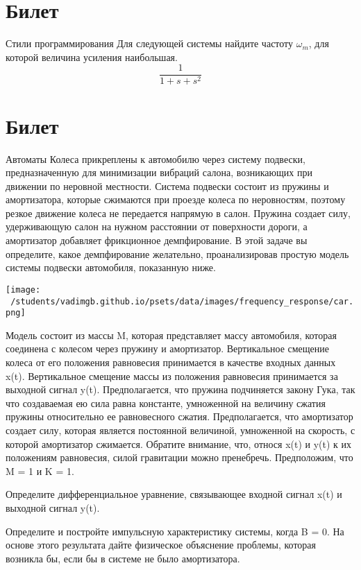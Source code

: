 \documentclass{exam}
\begin{document}
\section{Билет}
\begin{questions}
	\question 
		Стили программирования
	\question 
Для следующей системы найдите частоту \(\omega_m\), 
для которой величина усиления наибольшая.
	\[	
		\frac{1}{1+s+s^2}
		\]
\end{questions}
\vspace{15pt}

\section{Билет}
\begin{questions}
	\question 
		Автоматы
	\question
Колеса прикреплены к автомобилю через систему подвески, 
предназначенную для минимизации вибраций салона, возникающих 
при движении по неровной местности.
Система подвески состоит из пружины и амортизатора, которые 
сжимаются при проезде колеса по неровностям, поэтому резкое 
движение колеса не передается напрямую в салон.
Пружина создает силу, удерживающую салон на нужном расстоянии 
от поверхности дороги, а амортизатор добавляет фрикционное демпфирование.
В этой задаче вы определите, какое демпфирование желательно, 
проанализировав простую модель системы подвески автомобиля, показанную ниже.


	\texttt{[image: ~/students/vadimgb.github.io/psets/data/images/frequency\_response/car.png]}

Модель состоит из массы M, которая представляет массу автомобиля, 
которая соединена с колесом через пружину и амортизатор.
Вертикальное смещение колеса от его положения равновесия принимается 
в качестве входных данных x(t).
Вертикальное смещение массы из положения равновесия принимается за выходной сигнал y(t).
Предполагается, что пружина подчиняется закону Гука, так что создаваемая 
ею сила равна константе, умноженной на величину сжатия пружины относительно 
ее равновесного сжатия.
Предполагается, что амортизатор создает силу, которая является постоянной 
величиной, умноженной на скорость, с которой амортизатор сжимается.
Обратите внимание, что, относя x(t) и y(t) к их положениям равновесия, 
силой гравитации можно пренебречь.
Предположим, что M = 1 и K = 1.
	
Определите дифференциальное уравнение, связывающее входной 
		сигнал x(t) и выходной сигнал y(t).

Определите и постройте импульсную характеристику системы, когда B = 0.
На основе этого результата дайте физическое объяснение проблемы, 
которая возникла бы, если бы в системе не было амортизатора.
	
\end{questions}
\end{document}

